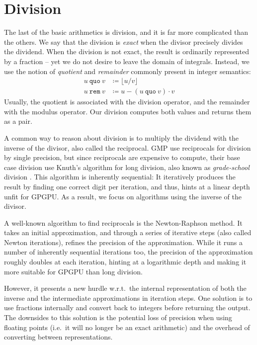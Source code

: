 \section{Division}
\label{sec:div}

The last of the basic arithmetics is division, and it is far more complicated
than the others. We say that the division is \textit{exact} when the divisor
precisely divides the dividend. When the division is not exact, the result is
ordinarily represented by a fraction -- yet we do not desire to leave the domain
of integrals. Instead, we use the notion of \textit{quotient} and
\textit{remainder} commonly present in integer semantics:
\begin{align}
  u~\mathtt{quo}~v &\coloneq \lfloor u/v \rfloor\\
  u~ \mathtt{rem}~v &\coloneq u - \left( u~\mathtt{quo}~v \right)\cdot v
\end{align}
Usually, the quotient is associated with the division operator, and the
remainder with the modulus operator. Our division computes both values and
returns them as a pair.

A common way to reason about division is to multiply the dividend with the
inverse of the divisor, also called the reciprocal. GMP use reciprocals for
division by single precision, but since reciprocals are expensive to compute,
their base case division use Knuth's algorithm for long division, also known as
\textit{grade-school} division \cite{GMP, knuth97}. This algorithm is inherently
sequential: It iteratively produces the result by finding one correct digit per
iteration, and thus, hints at a linear depth unfit for GPGPU. As a result, we
focus on algorithms using the inverse of the divisor.

A well-known algorithm to find reciprocals is the Newton-Raphson method. It
takes an initial approximation, and through a series of iterative steps (also
called Newton iterations), refines the precision of the approximation. While it
runs a number of inherently sequential iterations too, the precision of the
approximation roughly doubles at each iteration, hinting at a logarithmic depth
and making it more suitable for GPGPU than long division.

However, it presents a new hurdle w.r.t.\ the internal representation of both
the inverse and the intermediate approximations in iteration steps. One solution
is to use fractions internally and convert back to integers before returning the
output. The downsides to this solution is the potential loss of precision when
using floating points (i.e.\ it will no longer be an exact arithmetic) and the
overhead of converting between representations.

